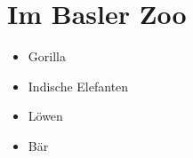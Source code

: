 \section{Im Basler Zoo}

\begin{itemize}
 
\item Gorilla
 
\item Indische Elefanten
 
\item Löwen

\item Bär

\end{itemize}
   

